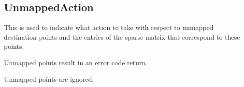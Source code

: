 \documentclass[letterpaper,10pt,english]{sphinxmanual}
\begin{document}
\subsection{UnmappedAction}
\label{\detokenize{UnmappedAction:unmappedaction}}\label{\detokenize{UnmappedAction::doc}}

\begin{fulllineitems}
\label{\detokenize{UnmappedAction:ESMF.api.constants.UnmappedAction}}
This is used to indicate what action to take with respect to unmapped destination
points and the entries of the sparse matrix that correspond to
these points.

\begin{fulllineitems}
\label{\detokenize{UnmappedAction:ESMF.api.constants.UnmappedAction.ERROR}}
Unmapped points result in an error code return.

\end{fulllineitems}


\begin{fulllineitems}
\label{\detokenize{UnmappedAction:ESMF.api.constants.UnmappedAction.IGNORE}}
Unmapped points are ignored.

\end{fulllineitems}


\end{fulllineitems}
\end{document}
